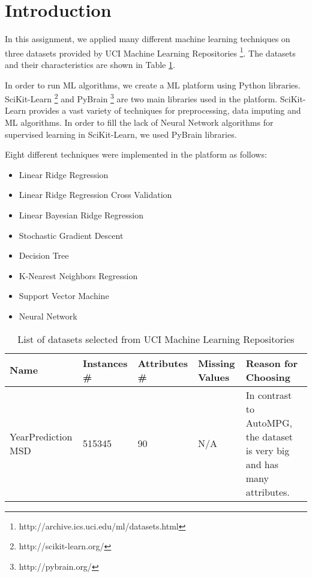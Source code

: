 \section{Introduction}
In this assignment, we applied many different machine learning techniques on three datasets provided by UCI Machine Learning Repositories \footnote{http://archive.ics.uci.edu/ml/datasets.html}. The datasets and their characteristics are shown in Table \ref{table:datasets}.

In order to run ML algorithms, we create a ML platform using Python libraries. SciKit-Learn \footnote{http://scikit-learn.org/} and PyBrain  \footnote{http://pybrain.org/} are two main libraries used in the platform. SciKit-Learn provides a vast variety of techniques for preprocessing, data imputing and ML algorithms. In order to fill the lack of Neural Network algorithms for supervised learning in SciKit-Learn, we used PyBrain libraries.

Eight different techniques were implemented in the platform as follows:
\begin{itemize}
  \item Linear Ridge Regression
  \item Linear Ridge Regression Cross Validation
  \item Linear Bayesian Ridge Regression
  \item Stochastic Gradient Descent
  \item Decision Tree
  \item K-Nearest Neighbors Regression
  \item Support Vector Machine
  \item Neural Network  
\end{itemize}

\begin{center}
\begin{table}
    \begin{tabular}{ | p{2.5cm} | p{1cm} | p{1cm} | p{1cm} | p{7cm} |}
    \hline
    Name & Instances \# & Attributes \# & Missing Values & Reason for Choosing \\ \hline
    YearPrediction MSD & 515345 & 90 & N/A & In contrast to AutoMPG, the dataset is very big and has many attributes.\\ \hline
    \end{tabular}
    \caption{List of datasets selected from UCI Machine Learning Repositories}
    \label{table:datasets}
    \end{table}
\end{center}
